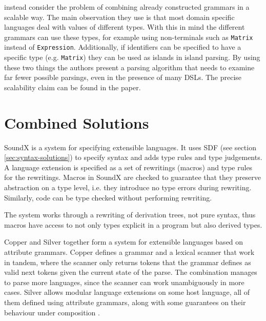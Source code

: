 \documentclass{kththesis}
\begin{document}
\textcite{Silkensen2013Well-Typed-Isla} instead consider the problem of combining already constructed grammars in a scalable way. The main observation they use is that most domain specific languages deal with values of different types. With this in mind the different grammars can use these types, for example using non-terminals such as \texttt{Matrix} instead of \texttt{Expression}. Additionally, if identifiers can be specified to have a specific type (e.g. \texttt{Matrix}) they can be used as islands in island parsing. By using these two things the authors present a parsing algorithm that needs to examine far fewer possible parsings, even in the presence of many DSLs. The precise scalability claim can be found in the paper.

\section{Combined Solutions} \label{sec:full-solutions}

SoundX \cite{Lorenzen2016Sound-type-depe} is a system for specifying extensible languages. It uses SDF (see section \ref{sec:syntax-solutions}) to specify syntax and adds type rules and type judgements. A language extension is specified as a set of rewritings (macros) and type rules for the rewritings. Macros in SoundX are checked to guarantee that they preserve abstraction on a type level, i.e. they introduce no type errors during rewriting. Similarly, code can be type checked without performing rewriting.

The system works through a rewriting of derivation trees, not pure syntax, thus macros have access to not only types explicit in a program but also derived types.

Copper \cite{Van-Wyk2007Context-aware-s} and Silver \cite{Van-Wyk2010Silver:-An-exte} together form a system for extensible languages based on attribute grammars. Copper defines a grammar and a lexical scanner that work in tandem, where the scanner only returns tokens that the grammar defines as valid next tokens given the current state of the parse. The combination manages to parse more languages, since the scanner can work unambiguously in more cases. Silver allows modular language extensions on some host language, all of them defined using attribute grammars, along with some guarantees on their behaviour under composition \cite{Kaminski2017Reliably-compos}.

\end{document}
